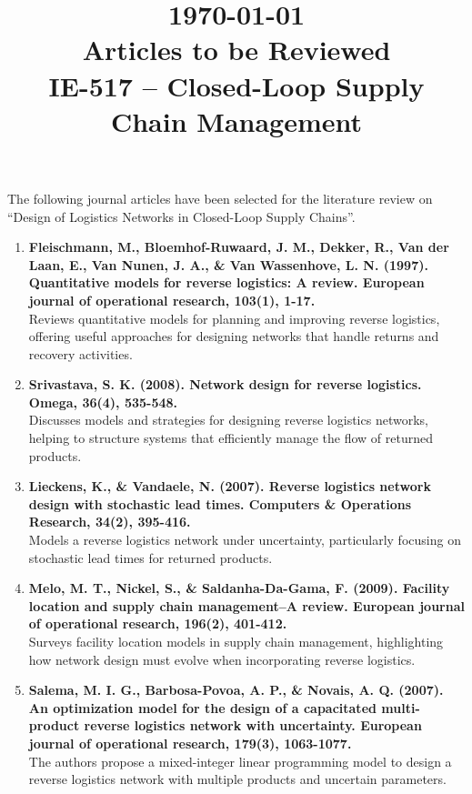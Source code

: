 \documentclass[12pt]{article}
\title{
    \hfill \normalsize\today \\
    \textbf{\Large Articles to be Reviewed}\\[0.5em]
    \large IE-517 -- Closed-Loop Supply Chain Management}
\author{\normalsize\fbox{
        \begin{tabular}{c@{\hspace{1cm}}c}
            Emek Irmak & Furkan Ertürk \\
            2444693 & 2740215 \\
        \end{tabular}
    }
        \date{}
}
\begin{document}
\maketitle
\onehalfspacing

\paragraph{} The following journal articles have been selected for the literature review on \enquote{Design of Logistics Networks in Closed-Loop Supply Chains}.

\begin{enumerate}
    \item \textbf{Fleischmann, M., Bloemhof-Ruwaard, J. M., Dekker, R., Van der Laan, E., Van Nunen, J. A., \& Van Wassenhove, L. N. (1997). Quantitative models for reverse logistics: A review. European journal of operational research, 103(1), 1-17.} \\[0.5em]
    {\small Reviews quantitative models for planning and improving reverse logistics, offering useful approaches for designing networks that handle returns and recovery activities.}

    \item \textbf{Srivastava, S. K. (2008). Network design for reverse logistics. Omega, 36(4), 535-548.} \\[0.5em]
    {\small Discusses models and strategies for designing reverse logistics networks, helping to structure systems that efficiently manage the flow of returned products.}

    \item \textbf{Lieckens, K., \& Vandaele, N. (2007). Reverse logistics network design with stochastic lead times. Computers \& Operations Research, 34(2), 395-416.} \\[0.5em]
    {\small Models a reverse logistics network under uncertainty, particularly focusing on stochastic lead times for returned products.}

    \item \textbf{Melo, M. T., Nickel, S., \& Saldanha-Da-Gama, F. (2009). Facility location and supply chain management–A review. European journal of operational research, 196(2), 401-412.} \\[0.5em]
    {\small Surveys facility location models in supply chain management, highlighting how network design must evolve when incorporating reverse logistics.}

    \item \textbf{Salema, M. I. G., Barbosa-Povoa, A. P., \& Novais, A. Q. (2007). An optimization model for the design of a capacitated multi-product reverse logistics network with uncertainty. European journal of operational research, 179(3), 1063-1077.} \\[0.5em]
    {\small The authors propose a mixed-integer linear programming model to design a reverse logistics network with multiple products and uncertain parameters.}


\end{enumerate}
\end{document}
